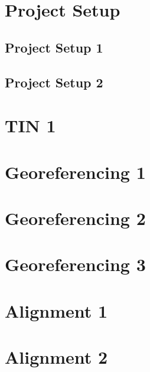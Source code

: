 \documentclass{scrartcl}
\begin{document}
\tableofcontents
\clearpage

\section{Project Setup}

\subsection{Project Setup 1}
\label{sec:project_setup_1}
\clearpage

\subsection{Project Setup 2}
\label{sec:project_setup_2}
\clearpage


\section{TIN 1}
\label{sec:tin_1}
\clearpage

\section{Georeferencing 1}
\label{sec:georeferencing_1}
\clearpage

\section{Georeferencing 2}
\label{sec:georeferencing_2}
\clearpage

\section{Georeferencing 3}
\label{sec:georeferencing_3}
\clearpage


\section{Alignment 1}
\label{sec:align_1}
\clearpage

\section{Alignment 2}
\label{sec:align_2}
\clearpage
\end{document}
